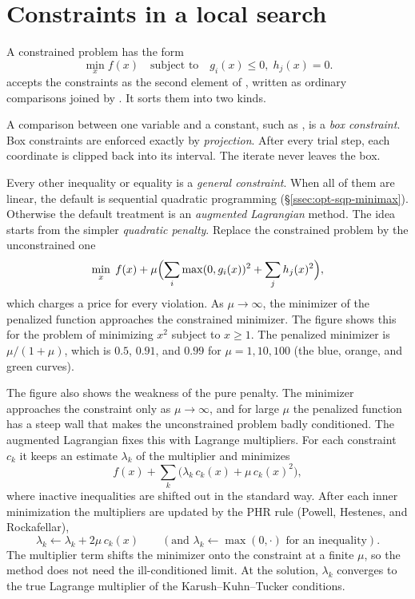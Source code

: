 \section{Constraints in a local search}
\label{sec:opt-local-constraints}

A constrained problem has the form
\[
  \min_x f(x) \quad \text{subject to} \quad g_i(x) \le 0,\; h_j(x) = 0 .
\]
 accepts the constraints as the second element of
, written as ordinary comparisons joined by \mcode{\&\&}.
It sorts them into two kinds.

A comparison between one variable and a constant, such as ,
is a \emph{box constraint}. Box constraints are enforced
exactly by \emph{projection}. After every trial step, each coordinate is clipped
back into its interval. The iterate never leaves the box.

Every other inequality or equality is a \emph{general constraint}. When all of them
are linear, the default is sequential quadratic programming
(\S\ref{ssec:opt-sqp-minimax}). Otherwise the default treatment is an \emph{augmented
Lagrangian} method. The idea starts from the simpler \emph{quadratic
penalty}. Replace the constrained problem by the
unconstrained one
\[
  \min_x\; f(x) + \mu \Bigl( \sum_i \max(0, g_i(x))^2 + \sum_j h_j(x)^2 \Bigr),
\]
which charges a price for every violation. As \(\mu \to \infty\), the minimizer
of the penalized function approaches the constrained minimizer. The figure shows
this for the problem of minimizing \(x^2\) subject to \(x \ge 1\). The
penalized minimizer is \(\mu/(1 + \mu)\), which is \(0.5\), \(0.91\), and
\(0.99\) for \(\mu = 1, 10, 100\) (the blue, orange, and green curves).


The figure also shows the weakness of the pure penalty. The minimizer
approaches the constraint only as \(\mu \to \infty\), and for large \(\mu\) the
penalized function has a steep wall that makes the unconstrained problem
badly conditioned. The augmented Lagrangian fixes this with Lagrange
multipliers. For each constraint \(c_k\) it keeps an estimate \(\lambda_k\) of
the multiplier and minimizes
\[
  f(x) + \sum_k \bigl(\lambda_k\, c_k(x) + \mu\, c_k(x)^2\bigr),
\]
where inactive inequalities are shifted out in the standard way. After each
inner minimization the multipliers are updated by the PHR rule (Powell,
Hestenes, and Rockafellar),
\[
  \lambda_k \leftarrow \lambda_k + 2\mu\, c_k(x)
  \qquad (\text{and } \lambda_k \leftarrow \max(0, \cdot) \text{ for an inequality}).
\]
The multiplier term shifts the minimizer onto the constraint at a finite
\(\mu\), so the method does not need the ill-conditioned limit. At the
solution, \(\lambda_k\) converges to the true Lagrange multiplier of the
Karush--Kuhn--Tucker conditions.

